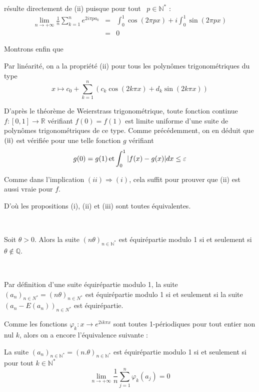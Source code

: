  r{\'e}sulte directement de (ii) puisque
pour tout \ $p \in \mathbb{N}^{\ast}$ :
\begin{eqnarray*}
  \underset{n \to + \infty}{\lim}   \frac{1}{n}  \sum_{k = 1}^n e^{2 i \pi
  pa_k}  & = &  \int_0^1 \cos (2 \pi px) + i \int_0^1 \sin (2 \pi px)\\
  & = & 0
\end{eqnarray*}


Montrons enfin que 

Par lin{\'e}arit{\'e}, on a la propri{\'e}t{\'e} (ii) pour tous les
polyn{\^o}mes trigonom{\'e}triques du type
\[ x \longmapsto c_0 + \sum_{k = 1}^n (c_k \cos (2 k \pi x) + d_k \sin (2 k
   \pi x)) \]


D'apr{\`e}s le th{\'e}or{\`e}me de Weierstrass trigonom{\'e}trique, toute
fonction continue $f : [0, 1] \to \mathbb{R}$ v{\'e}rifiant $f (0) = f (1)$
est limite uniforme d'une suite de polyn{\^o}mes trigonom{\'e}triques de ce
type. Comme pr{\'e}c{\'e}demment, on en d{\'e}duit que $(\operatorname{ii})$ est
v{\'e}rifi{\'e}e pour une telle fonction $g$ v{\'e}rifiant
\[ g (0) = g (1) \operatorname{et} \int_0^1 |f (x) - g (x) |dx \leq \varepsilon \]


Comme dans l'implication $(ii) {\Rightarrow} (i)$, cela suffit pour prouver que (ii) est aussi vraie pour $f$.

D'o{\`u} les propositions (i), (ii) et (iii) sont toutes {\'e}quivalentes.

\


Soit $\theta > 0$. Alors la suite $(n \theta)_{n \in \mathbb{N}^{\ast}}$ est
{\'e}quir{\'e}partie modulo 1 si et seulement si $\theta \nin \mathbb{Q}$.

\


Par d{\'e}finition d'une suite {\'e}quir{\'e}partie modulo 1, la suite
$(a_n)_{n \in N^{\ast}} = (n \theta)_{n \in N^{\ast}}$ est
{\'e}quir{\'e}partie modulo 1 si et seulement si la suite $(a_n - E (a_n))_{n
\in N^{\ast}}$ est {\'e}quir{\'e}partie.

Comme les fonctions $\varphi_k : x \to e^{2 ik \pi x}$ sont toutes
1-p{\'e}riodiques pour tout entier non nul $k$, alors on a encore
l'{\'e}quivalence suivante :

La suite $(a_n)_{n \in \mathbb{N}^{\ast}} = (n. \theta)_{n \in
\mathbb{N}^{\ast}}$ est {\'e}quir{\'e}partie modulo 1 si et seulement si pour
tout $k \in \mathbb{N}^{\ast}$
\[ \underset{n \to + \infty}{\lim }  \frac{1}{n}  \sum_{j = 1}^n \varphi_k
   (a_j) = 0 \]


